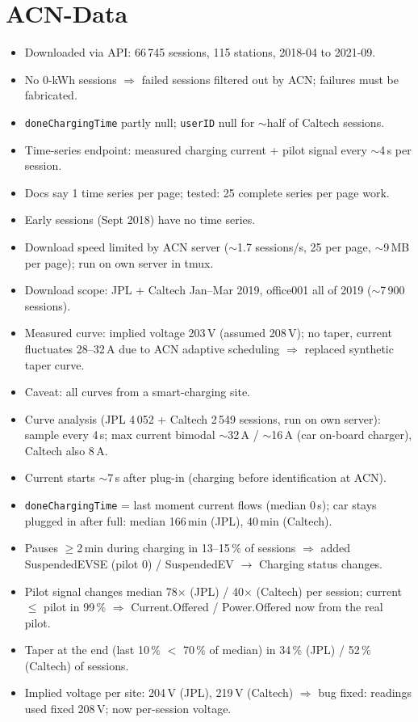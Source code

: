 \documentclass[11pt]{article}
\begin{document}
\section{ACN-Data}
\begin{itemize}
  \item Downloaded via API: 66\,745 sessions, 115 stations, 2018-04 to 2021-09.
  \item No 0-kWh sessions $\Rightarrow$ failed sessions filtered out by ACN; failures must be fabricated.
  \item \texttt{doneChargingTime} partly null; \texttt{userID} null for $\sim$half of Caltech sessions.
  \item Time-series endpoint: measured charging current + pilot signal every $\sim$4\,s per session.
  \item Docs say 1 time series per page; tested: 25 complete series per page work.
  \item Early sessions (Sept 2018) have no time series.
  \item Download speed limited by ACN server ($\sim$1.7 sessions/s, 25 per page, $\sim$9\,MB per page); run on own server in tmux.
  \item Download scope: JPL + Caltech Jan--Mar 2019, office001 all of 2019 ($\sim$7\,900 sessions).
  \item Measured curve: implied voltage 203\,V (assumed 208\,V); no taper, current fluctuates 28--32\,A due to ACN adaptive scheduling $\Rightarrow$ replaced synthetic taper curve.
  \item Caveat: all curves from a smart-charging site.
  \item Curve analysis (JPL 4\,052 + Caltech 2\,549 sessions, run on own server): sample every 4\,s; max current bimodal $\sim$32\,A / $\sim$16\,A (car on-board charger), Caltech also 8\,A.
  \item Current starts $\sim$7\,s after plug-in (charging before identification at ACN).
  \item \texttt{doneChargingTime} = last moment current flows (median 0\,s); car stays plugged in after full: median 166\,min (JPL), 40\,min (Caltech).
  \item Pauses $\geq$2\,min during charging in 13--15\,\% of sessions $\Rightarrow$ added SuspendedEVSE (pilot 0) / SuspendedEV $\to$ Charging status changes.
  \item Pilot signal changes median 78$\times$ (JPL) / 40$\times$ (Caltech) per session; current $\leq$ pilot in 99\,\% $\Rightarrow$ Current.Offered / Power.Offered now from the real pilot.
  \item Taper at the end (last 10\,\% $<$ 70\,\% of median) in 34\,\% (JPL) / 52\,\% (Caltech) of sessions.
  \item Implied voltage per site: 204\,V (JPL), 219\,V (Caltech) $\Rightarrow$ bug fixed: readings used fixed 208\,V; now per-session voltage.
\end{itemize}
\end{document}
